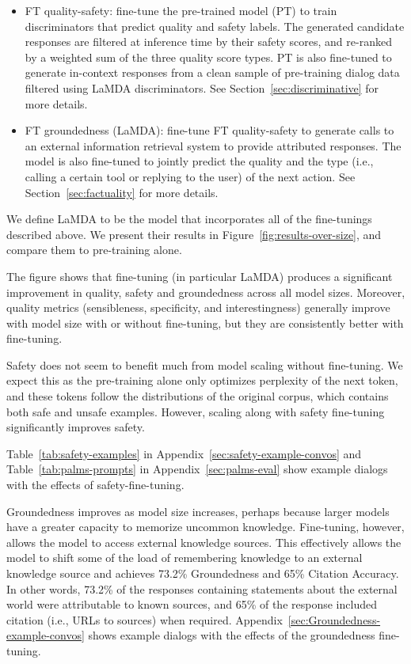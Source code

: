 \documentclass{article}
\def\knowledgetool{information retrieval system\xspace}
\def\Factualitymetric{Groundedness\xspace}
\begin{document}
\begin{itemize}
\item FT quality-safety: fine-tune the pre-trained model (PT) to train discriminators that predict quality and safety labels. The generated candidate responses are filtered at inference time by their safety scores, and re-ranked by a weighted sum of the three quality score types. PT is also fine-tuned to generate in-context responses from a clean sample of pre-training dialog data filtered using LaMDA discriminators. See Section~\ref{sec:discriminative} for more details.
\item FT groundedness (LaMDA): fine-tune FT quality-safety to generate calls to an external \knowledgetool to provide attributed responses. The model is also fine-tuned to jointly predict the quality and the type (i.e., calling a certain tool or replying to the user) of the next action. See Section~\ref{sec:factuality} for more details.
\end{itemize}

We define LaMDA to be the model that incorporates all of the fine-tunings described above. We present their results in Figure~\ref{fig:results-over-size}, and compare them to pre-training alone.

The figure shows that fine-tuning (in particular LaMDA) produces a significant improvement in quality, safety and groundedness across all model sizes. Moreover, quality metrics (sensibleness, specificity, and interestingness) generally improve with model size with or without fine-tuning, but they are consistently better with fine-tuning.

Safety does not seem to benefit much from model scaling without fine-tuning. We expect this as the pre-training alone only optimizes perplexity of the next token, and these tokens follow the distributions of the original corpus, which contains both safe and unsafe examples.
However, scaling along with safety fine-tuning significantly improves safety.

Table~\ref{tab:safety-examples} in Appendix~\ref{sec:safety-example-convos} and Table~\ref{tab:palms-prompts} in Appendix~\ref{sec:palms-eval} show example dialogs with the effects of safety-fine-tuning.

\Factualitymetric improves as model size increases, perhaps because larger models have a greater capacity to memorize uncommon knowledge. Fine-tuning, however, allows the model to access external knowledge sources. This effectively allows the model to shift some of the load of remembering knowledge to an external knowledge source and achieves 73.2\% \Factualitymetric and 65\% Citation Accuracy. In other words, 73.2\% of the responses containing statements about the external world were attributable to known sources, and 65\% of the response included citation (i.e., URLs to sources) when required.  Appendix~\ref{sec:Groundedness-example-convos} shows example dialogs with the effects of the groundedness fine-tuning.
\end{document}
